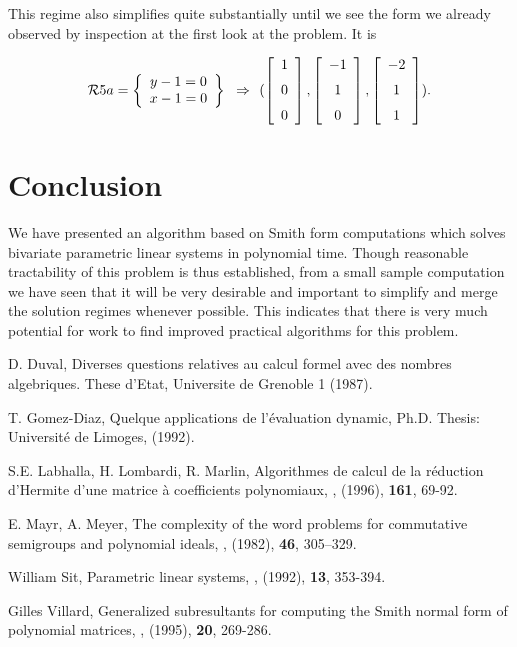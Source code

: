 \documentclass[10pt]{article}
\begin{document}
This regime also simplifies quite substantially until we see the form we already observed
by inspection at the first look at the problem.  It is

\[\RR5a = 
\breg y-1 = 0\\x-1 = 0\ereg \implies
(\left [\begin {array}{c} 1\\\noalign{\medskip}0\\\noalign{\medskip}0
\end {array}\right ]
,%
\left [\begin {array}{c} -1\\\noalign{\medskip}1\\\noalign{\medskip}0
\end {array}\right ]
,%
\left [\begin {array}{c} -2\\\noalign{\medskip}1\\\noalign{\medskip}
1\end {array}\right ]
).
\]

\section{Conclusion}
We have presented an algorithm based on Smith form computations which solves bivariate
parametric linear systems in polynomial time.  Though reasonable tractability of this 
problem is thus established, from a small sample computation we have 
seen that it will be very desirable and important to simplify and merge the solution 
regimes whenever possible.
This indicates that there is very much potential for work to find improved practical 
algorithms for this problem.

\begin{thebibliography}{fourr}

D. Duval,
\newblock  Diverses questions relatives au calcul formel avec des nombres algebriques.
\newblock These d'Etat, Universite de Grenoble 1 
\newblock (1987).

T. Gomez-Diaz,
\newblock Quelque applications de l'\'evaluation dynamic,
\newblock Ph.D. Thesis: Universit\'e de Limoges,
\newblock (1992).

S.E. Labhalla, H. Lombardi, R. Marlin,
\newblock Algorithmes de calcul de la r\'eduction d'Hermite d'une matrice \`a coefficients polynomiaux,
, (1996), {\bf 161}, 69-92.

E. Mayr, A. Meyer,
\newblock The complexity of the word problems for commutative semigroups and polynomial ideals,
, (1982), {\bf 46}, 305--329. 

William Sit,
\newblock Parametric linear systems,
, (1992), {\bf 13}, 353-394.

Gilles Villard,
\newblock Generalized subresultants for computing the Smith normal form of polynomial matrices,
, (1995), {\bf 20}, 269-286.


\end{thebibliography}


\end{document}
